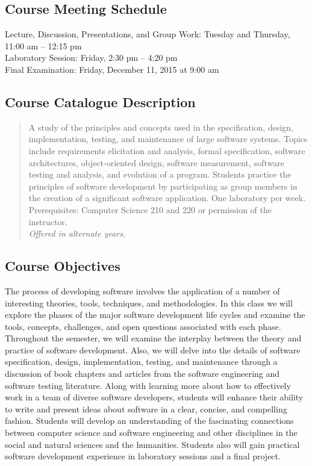 \subsection*{Course Meeting Schedule}

Lecture, Discussion, Presentations, and Group Work: Tuesday and Thursday, 11:00 am -- 12:15 pm \\
Laboratory Session: Friday, 2:30 pm -- 4:20 pm \\
Final Examination: Friday, December 11, 2015 at 9:00 am

\subsection*{Course Catalogue Description}

\begin{quote}

    A study of the principles and concepts used in the specification, design, implementation, testing, and maintenance
    of large software systems. Topics include requirements elicitation and analysis, formal specification, software
    architectures, object-oriented design, software measurement, software testing and analysis, and evolution of a
    program.  Students practice the principles of software development by participating as group members in the creation
    of a significant software application. One laboratory per week. Prerequisites: Computer Science 210 and 220 or
    permission of the instructor. \\ {\em Offered in alternate years}.

\end{quote}

\subsection*{Course Objectives}

The process of developing software involves the application of a number of interesting theories, tools, techniques, and
methodologies.  In this class we will explore the phases of the major software development life cycles and examine the
tools, concepts, challenges, and open questions associated with each phase.  Throughout the semester, we will examine
the interplay between the theory and practice of software development.  Also, we will delve into the details of software
specification, design, implementation, testing, and maintenance through a discussion of book chapters and articles from
the software engineering and software testing literature.  Along with learning more about how to effectively work in a
team of diverse software developers, students will enhance their ability to write and present ideas about software in a
clear, concise, and compelling fashion.  Students will develop an understanding of the fascinating connections
between computer science and software engineering and other disciplines in the social and natural sciences and the
humanities.  Students also will gain practical software development experience in laboratory sessions and a final
project.

